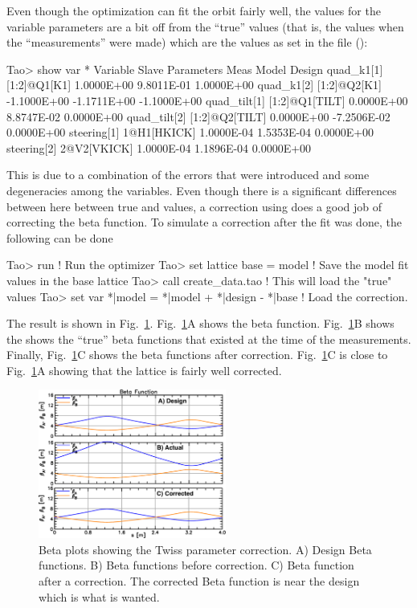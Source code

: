 \documentclass{hitec}     %
\begin{document}
{Even though the optimization can fit the orbit fairly well, the  values for the variable
parameters are a bit off from the ``true'' values (that is, the values when the ``measurements''
were made) which are the values as set in the  file ():
\begin{code}
Tao> show var *
  Variable         Slave Parameters        Meas         Model        Design 
  quad_k1[1]       [1:2]@Q1[K1]        1.0000E+00    9.8011E-01    1.0000E+00 
  quad_k1[2]       [1:2]@Q2[K1]       -1.1000E+00   -1.1711E+00   -1.1000E+00 
  quad_tilt[1]     [1:2]@Q1[TILT]      0.0000E+00    8.8747E-02    0.0000E+00 
  quad_tilt[2]     [1:2]@Q2[TILT]      0.0000E+00   -7.2506E-02    0.0000E+00 
  steering[1]      1@H1[HKICK]         1.0000E-04    1.5353E-04    0.0000E+00  
  steering[2]      2@V2[VKICK]         1.0000E-04    1.1896E-04    0.0000E+00 
\end{code}
This is due to a combination of the errors that were introduced and some degeneracies among the
variables. Even though there is a significant differences between here between true and 
values, a correction using  does a good job of correcting the beta function. To simulate a
correction after the fit was done, the following can be done
\begin{code}
Tao> run                       ! Run the optimizer
Tao> set lattice base = model  ! Save the model fit values in the base lattice
Tao> call create_data.tao      ! This will load the "true" values
Tao> set var *|model = *|model + *|design - *|base  ! Load the correction.
\end{code}
The result is shown in Fig.~\ref{f:beta}. Fig.~\ref{f:beta}A shows the  beta function. 
Fig.~\ref{f:beta}B shows the shows the ``true'' beta functions that existed at the time of the
measurements. Finally, Fig.~\ref{f:beta}C shows the beta functions after correction. Fig.~\ref{f:beta}C
is close to Fig.~\ref{f:beta}A showing that the lattice is fairly well corrected.

\begin{figure}[tb]
  \centering
  \includegraphics[width=0.55\textwidth]{beta.pdf}
  \caption{Beta plots showing the Twiss parameter correction. A) Design Beta functions. B)
Beta functions before correction. C) Beta function after a correction. The corrected Beta function
is near the design which is what is wanted.}
  \label{f:beta}
\end{figure}


}
\end{document}
